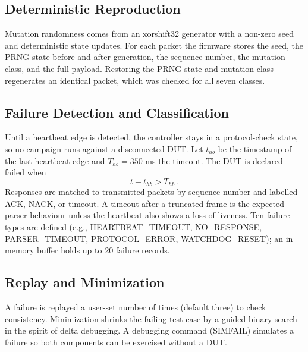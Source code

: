 \documentclass[10pt,letterpaper]{article}
\begin{document}
\subsection{Deterministic Reproduction}
Mutation randomness comes from an xorshift32 generator with a non-zero seed and deterministic state updates. For each packet the firmware stores the seed, the PRNG state before and after generation, the sequence number, the mutation class, and the full payload. Restoring the PRNG state and mutation class regenerates an identical packet, which was checked for all seven classes.

\subsection{Failure Detection and Classification}
Until a heartbeat edge is detected, the controller stays in a protocol-check state, so no campaign runs against a disconnected DUT. Let $t_{hb}$ be the timestamp of the last heartbeat edge and $T_{hb} = 350$ ms the timeout. The DUT is declared failed when
\begin{equation}
t - t_{hb} > T_{hb}~. \tag{2}
\end{equation}
Responses are matched to transmitted packets by sequence number and labelled ACK, NACK, or timeout. A timeout after a truncated frame is the expected parser behaviour unless the heartbeat also shows a loss of liveness. Ten failure types are defined (e.g., HEARTBEAT\_TIMEOUT, NO\_RESPONSE, PARSER\_TIMEOUT, PROTOCOL\_ERROR, WATCHDOG\_RESET); an in-memory buffer holds up to 20 failure records.

\subsection{Replay and Minimization}
A failure is replayed a user-set number of times (default three) to check consistency. Minimization shrinks the failing test case by a guided binary search in the spirit of delta debugging. A debugging command (SIMFAIL) simulates a failure so both components can be exercised without a DUT.
\end{document}
